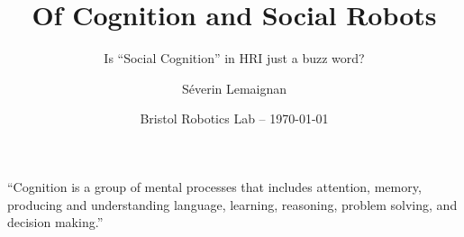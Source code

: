 \documentclass[compress]{beamer}
\title{Of Cognition and Social Robots}
\subtitle{Is ``Social Cognition'' in HRI just a buzz word?}
\date{Bristol Robotics Lab -- {\Medium \today}}
\author{Séverin Lemaignan}
\institute{Centre for Robotics and Neural Systems\\{\Medium
Plymouth University}}
\begin{document}
\maketitle



\begin{frame}[plain]{}

        \LARGE

        ``Cognition is a group of mental processes that includes {\Medium
        attention}, {\Medium memory}, producing and understanding {\Medium
        language}, {\Medium learning}, {\Medium reasoning}, {\Medium problem
        solving}, and {\Medium decision making}.''

\end{frame}
\end{document}
